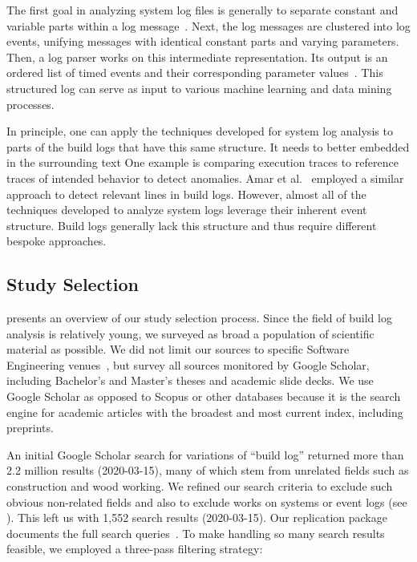 The first goal in analyzing system log files is generally to
separate constant and variable parts within a log
message~\cite{nagappan2010abstracting,he2017towards}.
Next, the log
messages are clustered into log events, unifying messages with
identical constant parts and varying parameters.
Then, a log parser works on this intermediate representation.
Its output is an ordered list of timed events and their corresponding
parameter values~\cite{he2016evaluation}.
This structured log can serve as input to various machine learning and
data mining processes.

In principle, one can apply the techniques developed for system log
analysis
to parts of the build logs that have this same structure.
It needs to better embedded in the surrounding text
One example is comparing execution traces to reference
traces of intended behavior to detect anomalies.
Amar et
al.~\cite{amar2019mining} employed a similar approach to detect
relevant lines in build logs.
However, almost all of the techniques developed to analyze system logs
leverage their inherent event structure.
Build logs generally lack this structure and thus require different
bespoke approaches.


\subsection{Study Selection}
 presents an overview of our study selection
process.
Since the field of build log analysis is relatively young, we
surveyed as broad a population of scientific material as possible.
We did not limit our sources to specific Software Engineering
venues~\cite{petersen2015guidelines}, but survey all sources
monitored by Google Scholar, including Bachelor's and Master's
theses and academic slide decks.
We use Google Scholar as opposed to Scopus or
other databases because it is the search engine for academic articles with
the broadest and most current index, including preprints.

An initial Google Scholar search for variations of ``build log''
returned more than 2.2 million results (2020-03-15), many of which stem
from unrelated fields such as construction and wood working.
We refined our search criteria to exclude such obvious
non-related fields and also to exclude works on systems
or event logs (see ).
This left us with 1,552 search results
(2020-03-15).
Our replication package documents the full search
queries~\cite{brandt2020chunk-replication}.
To make handling so many search results feasible, we employed a
three-pass filtering strategy:

